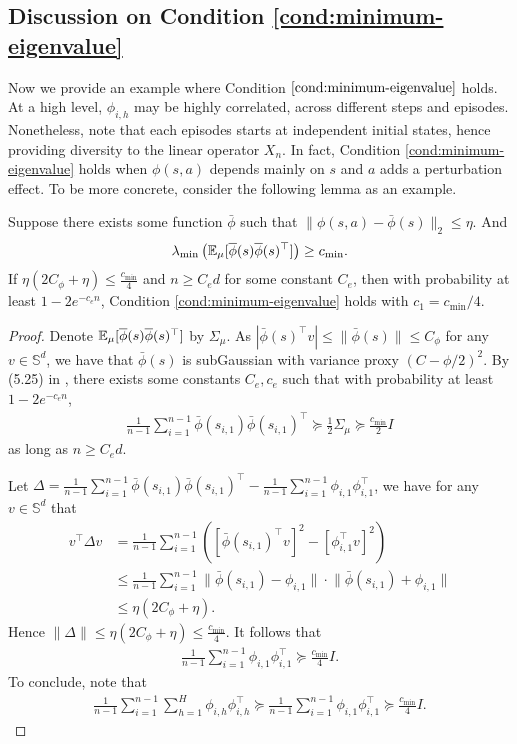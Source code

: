 \subsection{Discussion on Condition \eqref{cond:minimum-eigenvalue}}
Now we provide an example where Condition $\eqref{cond:minimum-eigenvalue}$ holds. At a high level, $\phi_{i,h}$ may be highly correlated, across different steps and episodes. Nonetheless, note that each episodes starts at independent initial states, hence providing diversity to the linear operator $X_n$. In fact, Condition \eqref{cond:minimum-eigenvalue} holds when $\phi(s,a)$ depends mainly on $s$ and $a$ adds a perturbation effect. To be more concrete, consider the following lemma as an example.

\begin{lemma}
Suppose there exists some  function $\bar\phi$ such that  $\|\phi(s,a)-\bar\phi(s)\|_2\le \eta$. And 
\begin{align*}
\lambda_{\min}\left(\mathbb{E}_\mu[\overline\phi(s)\overline\phi(s)^\top]\right)\ge c_{\min}.
\end{align*}
If $\eta(2C_\phi+\eta)\le \frac{c_{\min}}{4}$ and $n\ge C_e d$ for some constant $C_e$, then with probability at least $1-2e^{-c_en}$, Condition \eqref{cond:minimum-eigenvalue} holds with $c_1=c_{\min}/4$.
\end{lemma}
\begin{proof}
Denote $\mathbb{E}_\mu[\overline\phi(s)\overline\phi(s)^\top]$ by $\Sigma_\mu$. As $|\bar\phi(s)^\top v|\le \|\bar\phi(s)\|\le C_\phi$ for any $v\in \mathbb{S}^d$, we have that $\bar\phi(s)$ is subGaussian with variance proxy $(C-\phi/2)^2$.
By (5.25) in \cite{vershynin2010introduction}, there exists some constants $C_e,c_e$ such that with probability at least $1-2e^{-c_en}$,
\begin{align*}
\frac{1}{n-1}\sum_{i=1}^{n-1}\bar\phi(s_{i,1})\bar\phi(s_{i,1})^\top\succeq\frac{1}{2}\Sigma_\mu\succeq \frac{c_{\min}}{2}I
\end{align*} as long as $n\ge C_ed$.

Let $\Delta=\frac{1}{n-1}\sum_{i=1}^{n-1}\bar\phi(s_{i,1})\bar\phi(s_{i,1})^\top-\frac{1}{n-1}\sum_{i=1}^{n-1}\phi_{i,1}\phi_{i,1}^\top$, we have for any $v\in \mathbb{S}^d$ that
\begin{align*}
v^\top \Delta v&=\frac{1}{n-1}\sum_{i=1}^{n-1}\left([\bar\phi(s_{i,1})^\top v]^2-[\phi_{i,1}^\top v]^2\right)\\&\le \frac{1}{n-1}\sum_{i=1}^{n-1}\Big\|\bar\phi(s_{i,1})-\phi_{i,1}\Big\|\cdot\Big\|\bar\phi(s_{i,1})+\phi_{i,1}\Big\|\\&\le \eta(2C_\phi+\eta).
\end{align*}
Hence $\|\Delta\|\le \eta(2C_\phi+\eta)\le \frac{c_{\min}}{4}$. It follows that
\begin{align*}
\frac{1}{n-1}\sum_{i=1}^{n-1}\phi_{i,1}\phi_{i,1}^\top\succeq \frac{c_{\min}}{4}I.
\end{align*}
To conclude, note that 
\begin{align*}
\frac{1}{n-1}\sum_{i=1}^{n-1}\sum_{h=1}^H\phi_{i,h}\phi_{i,h}^\top
\succeq\frac{1}{n-1}\sum_{i=1}^{n-1}\phi_{i,1}\phi_{i,1}^\top\succeq \frac{c_{\min}}{4}I.
\end{align*}
\end{proof}

